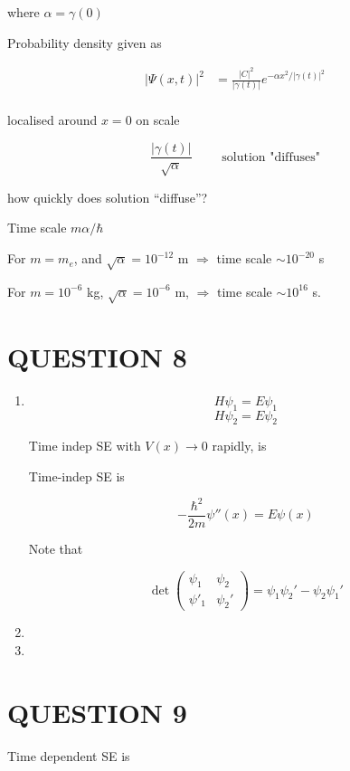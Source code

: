\documentclass[a4paper]{article}
\begin{document}
where $ \alpha = \gamma(0) $


Probability density given as 

\begin{align*}
|   \Psi(x,t)  |^{2} & = \frac{| C |^{2}}{| \gamma(t) |} e^{- \alpha x^{2} / | \gamma(t) |^{2} } \\
\end{align*}


localised around $ x = 0 $ on scale 

\[ \frac{| \gamma(t) |}{\sqrt{\alpha}} \qquad \text{ solution "diffuses"}\]

how quickly does solution ``diffuse''?

Time scale $ m \alpha / \hbar  $

For $ m = m_{e} $, and $ \sqrt{\alpha} = 10^{-12} $ m $ \Rightarrow $ time scale $ \sim 10^{-20} $ s

For $ m = 10^{-6} $ kg, $ \sqrt{\alpha} = 10^{-6} $ m, $ \Rightarrow $ time scale $ \sim 10^{16} $ s. 

\section{QUESTION 8}


\begin{enumerate}
	\item \[ H \psi_{1} = E \psi_{1} \]
	\[ H \psi_{2} = E \psi_{2} \]
	
	Time indep SE with $ V(x) \to 0 $ rapidly, is
	
	Time-indep SE is
	
	\[ - \frac{\hbar^{2}}{2m}\psi''(x)  = E \psi(x) \]
	
	Note that 
	
	\[ \det \begin{pmatrix}
	\psi_{1} & \psi_{2} \\
	\psi'_{1} & \psi_{2}'
	\end{pmatrix} = \psi_{1} \psi_{2}'  - \psi_{2} \psi_{1}'  \] 
	
	\item 
	\item
	
\end{enumerate}


\section{QUESTION 9}  

Time dependent SE is    
\end{document}

